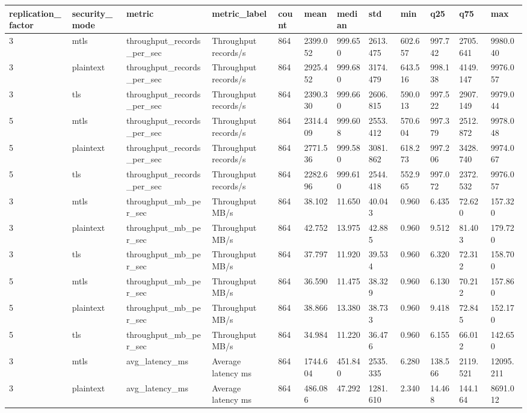 \begin{longtable}{llllllllllll}
\hline
replication\_factor & security\_mode & metric & metric\_label & count & mean & median & std & min & q25 & q75 & max \\
\hline
3 & mtls & throughput\_records\_per\_sec & Throughput records/s & 864 & 2399.052 & 999.650 & 2613.475 & 602.657 & 997.742 & 2705.641 & 9980.040 \\
3 & plaintext & throughput\_records\_per\_sec & Throughput records/s & 864 & 2925.452 & 999.680 & 3174.479 & 643.516 & 998.138 & 4149.147 & 9976.057 \\
3 & tls & throughput\_records\_per\_sec & Throughput records/s & 864 & 2390.330 & 999.660 & 2606.815 & 590.013 & 997.522 & 2907.149 & 9979.044 \\
5 & mtls & throughput\_records\_per\_sec & Throughput records/s & 864 & 2314.409 & 999.608 & 2553.412 & 570.604 & 997.379 & 2512.872 & 9978.048 \\
5 & plaintext & throughput\_records\_per\_sec & Throughput records/s & 864 & 2771.536 & 999.580 & 3081.862 & 618.273 & 997.206 & 3428.740 & 9974.067 \\
5 & tls & throughput\_records\_per\_sec & Throughput records/s & 864 & 2282.696 & 999.610 & 2544.418 & 552.965 & 997.072 & 2372.532 & 9976.057 \\
3 & mtls & throughput\_mb\_per\_sec & Throughput MB/s & 864 & 38.102 & 11.650 & 40.043 & 0.960 & 6.435 & 72.620 & 157.320 \\
3 & plaintext & throughput\_mb\_per\_sec & Throughput MB/s & 864 & 42.752 & 13.975 & 42.885 & 0.960 & 9.512 & 81.403 & 179.720 \\
3 & tls & throughput\_mb\_per\_sec & Throughput MB/s & 864 & 37.797 & 11.920 & 39.534 & 0.960 & 6.320 & 72.312 & 158.700 \\
5 & mtls & throughput\_mb\_per\_sec & Throughput MB/s & 864 & 36.590 & 11.475 & 38.329 & 0.960 & 6.130 & 70.212 & 157.860 \\
5 & plaintext & throughput\_mb\_per\_sec & Throughput MB/s & 864 & 38.866 & 13.380 & 38.733 & 0.960 & 9.418 & 72.845 & 152.170 \\
5 & tls & throughput\_mb\_per\_sec & Throughput MB/s & 864 & 34.984 & 11.220 & 36.476 & 0.960 & 6.155 & 66.012 & 142.650 \\
3 & mtls & avg\_latency\_ms & Average latency ms & 864 & 1744.604 & 451.840 & 2535.335 & 6.280 & 138.566 & 2119.521 & 12095.211 \\
3 & plaintext & avg\_latency\_ms & Average latency ms & 864 & 486.086 & 47.292 & 1281.610 & 2.340 & 14.468 & 144.164 & 8691.012 \\

\end{longtable}
